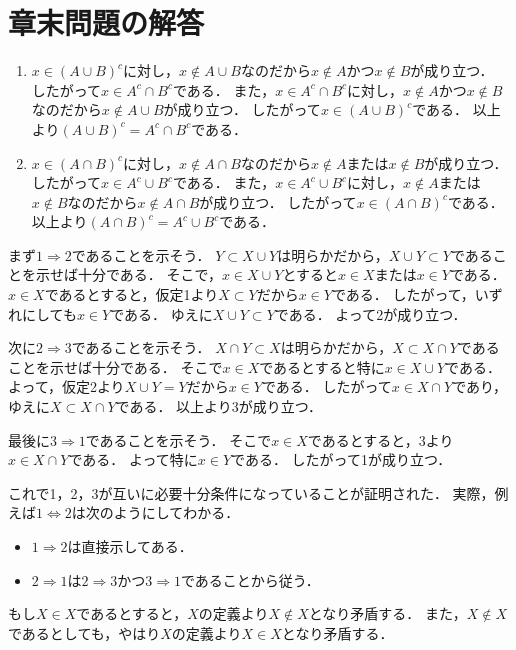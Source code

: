 ﻿\documentclass[./main]{subfiles} %
\theoremstyle{definition}
\begin{document}
\section{章末問題の解答}
\begin{enumerate}
\item $x\in(A\cup B)^c$に対し，$x\notin A\cup B$なのだから$x\notin A$かつ$x\notin B$が成り立つ．
したがって$x\in A^c\cap B^c$である．
また，$x\in A^c\cap B^c$に対し，$x\notin A$かつ$x\notin B$なのだから$x\notin A\cup B$が成り立つ．
したがって$x\in(A\cup B)^c$である．
以上より$(A\cup B)^c=A^c\cap B^c$である．
\item $x\in(A\cap B)^c$に対し，$x\notin A\cap B$なのだから$x\notin A$または$x\notin B$が成り立つ．
したがって$x\in A^c\cup B^c$である．
また，$x\in A^c\cup B^c$に対し，$x\notin A$または$x\notin B$なのだから$x\notin A\cap B$が成り立つ．
したがって$x\in(A\cap B)^c$である．
以上より$(A\cap B)^c=A^c\cup B^c$である．
\end{enumerate}

まず$1\Rightarrow2$であることを示そう．
$Y\subset X\cup Y$は明らかだから，$X\cup Y\subset Y$であることを示せば十分である．
そこで，$x\in X\cup Y$とすると$x\in X$または$x\in Y$である．
$x\in X$であるとすると，仮定1より$X\subset Y$だから$x\in Y$である．
したがって，いずれにしても$x\in Y$である．
ゆえに$X\cup Y\subset Y$である．
よって2が成り立つ．

次に$2\Rightarrow3$であることを示そう．
$X\cap Y\subset X$は明らかだから，$X\subset X\cap Y$であることを示せば十分である．
そこで$x\in X$であるとすると特に$x\in X\cup Y$である．
よって，仮定2より$X\cup Y=Y$だから$x\in Y$である．
したがって$x\in X\cap Y$であり，ゆえに$X\subset X\cap Y$である．
以上より3が成り立つ．

最後に$3\Rightarrow1$であることを示そう．
そこで$x\in X$であるとすると，3より$x\in X\cap Y$である．
よって特に$x\in Y$である．
したがって1が成り立つ．

これで1，2，3が互いに必要十分条件になっていることが証明された．
実際，例えば$1\Leftrightarrow2$は次のようにしてわかる．
\begin{itemize}
\item $1\Rightarrow2$は直接示してある．
\item $2\Rightarrow1$は$2\Rightarrow3$かつ$3\Rightarrow1$であることから従う．
\end{itemize}

もし$X\in X$であるとすると，$X$の定義より$X\notin X$となり矛盾する．
また，$X\notin X$であるとしても，やはり$X$の定義より$X\in X$となり矛盾する．
\end{document}

